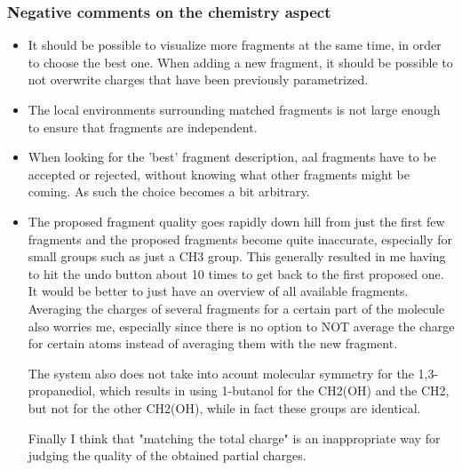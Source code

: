 \subsubsection{Negative comments on the chemistry aspect}
\begin{itemize}
\item It should be possible to visualize more fragments at the same time, in order to choose the best one. When adding a new fragment, it should be possible to not overwrite charges that have been previously parametrized.

\item The local environments surrounding matched fragments is not large enough to ensure that fragments are independent. 

\item When looking for the 'best' fragment description, aal fragments have to be accepted or rejected, without knowing what other fragments might be coming. As such the choice becomes a bit arbitrary.

\item The proposed fragment quality goes rapidly down hill from just the first few fragments and the proposed fragments become quite inaccurate, especially for small groups such as just a CH3 group. This generally resulted in me having to hit the undo button about 10 times to get back to the first proposed one. It would be better to just have an overview of all available fragments. Averaging the charges of several fragments for a certain part of the molecule also worries me, especially since there is no option to NOT average the charge for certain atoms instead of averaging them with the new fragment.





The system also does not take into acount molecular symmetry for the 1,3-propanediol, which results in using 1-butanol for the CH2(OH) and the CH2, but not for the other CH2(OH), while in fact these groups are identical. 





Finally I think that "matching the total charge" is an inappropriate way for judging the quality of the obtained partial charges.

\end{itemize}


